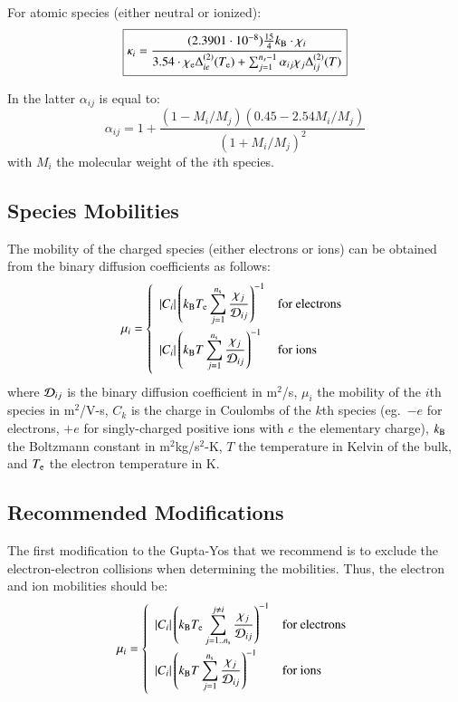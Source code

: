 \documentclass{warpdoc}
\newcommand{\alb}{\vspace{0.1cm}\\} %
\newcommand{\mfd}{\displaystyle}
\newcommand\frameeqn[1]{\fbox{$\displaystyle #1$}}
\begin{document}
For atomic species (either neutral or ionized):
%
\begin{equation}
\frameeqn{
\kappa_i = \frac{(2.3901\cdot10^{-8}) \frac{15}{4} k_{\rm B}  \cdot \chi_i}{3.54\cdot \chi_{\rm e} \Delta_{ie}^{(2)}(T_{\rm e})+ \sum_{j=1}^{n_s-1} \alpha_{ij} \chi_j \Delta_{ij}^{(2)}(T) }
}
\end{equation}
%

In the latter $\alpha_{ij}$ is equal to:
%
\begin{equation}
\alpha_{ij}=1+ \frac{(1- M_i/M_j)(0.45-2.54 M_i / M_j)}{(1+ M_i/M_j)^2}
\end{equation}
%
with $M_i$ the molecular weight of the $i$th species.

\subsection{Species Mobilities}

The mobility of the charged species (either electrons or ions) can be obtained from the binary diffusion coefficients as follows:
%
\begin{equation}
 \mu_i= \left\{\begin{array}{ll}
   \mfd  |C_i| \left( k_{\rm B} T_{\rm e} \sum_{j=1}^{n_{\rm s}} \frac{\chi_j}{{\cal D}_{ij}}\right)^{-1} & \textrm{for electrons} \alb
    \mfd  |C_i| \left( k_{\rm B} T \sum_{j=1}^{n_{\rm s}} \frac{\chi_j}{{\cal D}_{ij}}\right)^{-1} & \textrm{for ions} \alb
 \end{array} \right.
\end{equation}
%
where ${\cal D}_{ij}$ is the binary diffusion coefficient in m$^2$/s, $\mu_i$ the mobility of the $i$th species in m$^2$/V-s, $C_k$ is the charge in Coulombs of the $k$th species (eg.\ $-e$ for electrons, $+e$ for singly-charged positive ions with $e$ the elementary charge), $k_{\rm B}$ the Boltzmann constant in m$^2$kg/s$^2$-K, $T$ the temperature in Kelvin of the bulk, and $T_{\rm e}$ the electron temperature in K.

\subsection{Recommended Modifications}

The first modification to the Gupta-Yos that we recommend is to exclude the electron-electron collisions when determining the mobilities. Thus, the electron and ion mobilities should be:
%
\begin{equation}
 \mu_i= \left\{\begin{array}{ll}
   \mfd  |C_i| \left( k_{\rm B} T_{\rm e} \sum_{j=1..n_{\rm s}}^{j\neq i} \frac{\chi_j}{{\cal D}_{ij}}\right)^{-1} & \textrm{for electrons} \alb
    \mfd  |C_i| \left( k_{\rm B} T \sum_{j=1}^{n_{\rm s}} \frac{\chi_j}{{\cal D}_{ij}}\right)^{-1} & \textrm{for ions} \alb
 \end{array} \right.
\end{equation}
%
\end{document}
